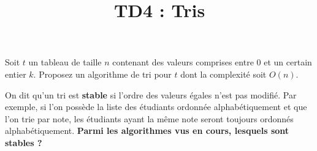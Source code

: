 \documentclass{../cours}
\title{TD4 : Tris}
\begin{document}
\maketitle

\begin{exercice}[Casiers]

Soit $t$ un tableau de taille $n$ contenant des valeurs comprises entre $0$ et un certain entier $k$. Proposez un algorithme 
de tri pour $t$ dont la complexité soit $O(n)$. 

\end{exercice}

\begin{exercice}[Stabilité]

On dit qu'un tri est \textbf{stable} si l'ordre des valeurs égales n'est pas modifié. Par exemple, si l'on possède la liste des étudiants ordonnée alphabétiquement et que l'on trie par note, les étudiants ayant la même note seront toujours ordonnés alphabétiquement. \textbf{Parmi les algorithmes vus en cours, lesquels sont stables ?} 

\end{exercice}
\end{document}

